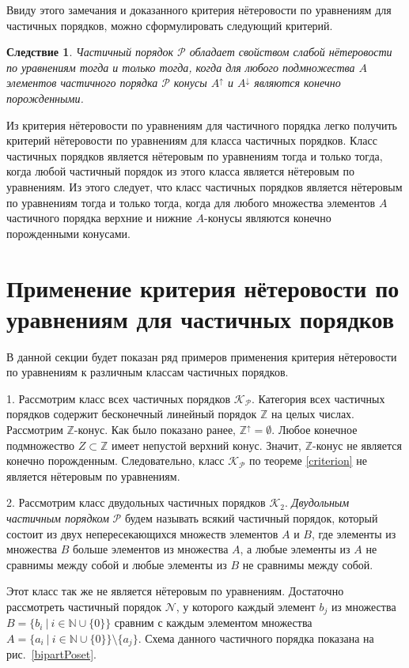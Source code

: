 \documentclass[12pt]{article}
\theoremstyle{break}
\newtheorem{Con}{Следствие}
\def\P{\mathcal{P}}
\begin{document}
		Ввиду этого замечания и доказанного критерия нётеровости по уравнениям для частичных порядков, можно сформулировать следующий критерий.

		\begin{Con}
			Частичный порядок $\P$ обладает свойством слабой нётеровости по уравнениям тогда и только тогда, когда для любого подмножества $A$ элементов частичного порядка $\P$ конусы $A^{\uparrow}$ и $A^{\downarrow}$ являются конечно порожденными.
		\end{Con}

		Из критерия нётеровости по уравнениям для частичного порядка легко получить критерий нётеровости по уравнениям для класса частичных порядков. Класс частичных порядков является нётеровым по уравнениям тогда и только тогда, когда любой частичный порядок из этого класса является нётеровым по уравнениям. Из этого следует, что класс частичных порядков является нётеровым по уравнениям тогда и только тогда, когда для любого множества элементов $A$ частичного порядка верхние и нижние $A$-конусы являются конечно порожденными конусами.


	\section{Применение критерия нётеровости по уравнениям для частичных порядков}
		В данной секции будет показан ряд примеров применения критерия нётеровости по уравнениям к различным классам частичных порядков.

		1. Рассмотрим класс всех частичных порядков $\mathcal{K}_{\P}.$ Категория всех частичных порядков содержит бесконечный линейный порядок $\mathbb{Z}$ на целых числах. Рассмотрим $\mathbb{Z}$-конус. Как было показано ранее, $\mathbb{Z}^{\uparrow} = \emptyset$. Любое конечное подмножество $Z\subset\mathbb{Z}$ имеет непустой верхний конус. Значит, $\mathbb{Z}$-конус не является конечно порожденным. Следовательно, класс $\mathcal{K}_{\P}$ по теореме \ref{criterion} не является нётеровым по уравнениям.

		2. Рассмотрим класс двудольных частичных порядков $\mathcal{K}_2$. \textit{Двудольным частичным порядком} $\P$ будем называть всякий частичный порядок, который состоит из двух непересекающихся множеств элементов $A$ и $B$, где элементы из множества $B$ больше элементов из множества $A$, а любые элементы из $A$ не сравнимы между собой и любые элементы из $B$ не сравнимы между собой.

		Этот класс так же не является нётеровым по уравнениям. Достаточно рассмотреть частичный порядок $\mathcal{N}$, у которого каждый элемент $b_j$ из множества $B = \{b_i\ |\ i\in \mathbb{N}\cup\{0\}\}$ сравним с каждым элементом множества $A = \{a_i\ |\ i\in \mathbb{N}\cup\{0\}\} \setminus \{a_j\}$. Схема данного частичного порядка показана на рис.~\ref{bipartPoset}.
\end{document}
